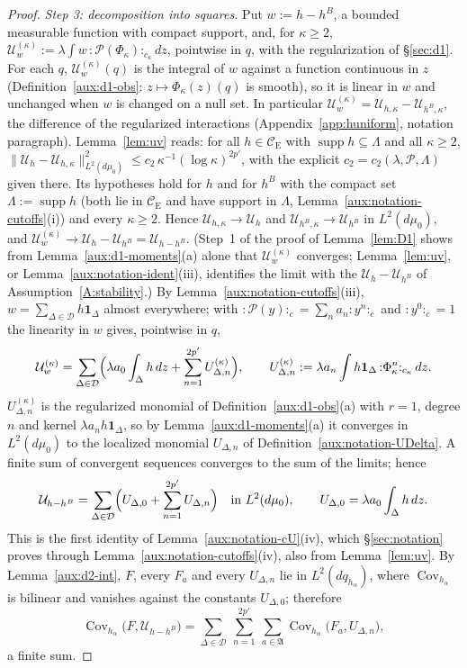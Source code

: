 \documentclass[11pt,a4paper]{article}
\theoremstyle{plain}
\theoremstyle{definition}
\theoremstyle{plain}
\theoremstyle{definition}
\newcommand{\CE}{\mathcal{C}_{\mathrm E}}
\DeclareMathOperator{\supp}{supp}
\DeclareMathOperator{\Cov}{Cov}
\newcommand{\Uc}{\mathcal U}
\newcommand{\dmu}{d\mu_0}
\begin{document}
\begin{proof}
\emph{Step 3: decomposition into squares.}  Put $w:=h-h^B$, a bounded measurable function with
compact support, and, for $\kappa\ge2$, $\Uc^{(\kappa)}_w:=\lambda\int w\,{:}\mathscr
P(\Phi_\kappa){:}_{c_\kappa}dz$, pointwise in $q$, with the regularization of
\S\ref{sec:d1}.  For each $q$, $\Uc^{(\kappa)}_w(q)$ is the integral of $w$ against a function
continuous in $z$ (Definition~\ref{aux:d1-obs}: $z\mapsto\Phi_\kappa(z)(q)$ is smooth), so it is
linear in $w$ and unchanged when $w$ is changed on a null set.  In particular
$\Uc^{(\kappa)}_w=\Uc_{h,\kappa}-\Uc_{h^B,\kappa}$, the difference of the regularized
interactions (Appendix~\ref{app:huniform}, notation paragraph).  Lemma~\ref{lem:uv} reads:
for all $h\in\CE$ with $\supp h\subseteq\Lambda$ and all $\kappa\ge2$,
$\|\mathcal U_h-\mathcal U_{h,\kappa}\|_{L^2(d\mu_0)}^2\le c_2\,\kappa^{-1}(\log\kappa)^{2p'}$,
with the explicit $c_2=c_2(\lambda,\mathscr P,\Lambda)$ given there.
Its hypotheses hold for $h$ and for $h^B$ with the compact set $\Lambda:=\supp h$ (both lie in
$\CE$ and have support in $\Lambda$, Lemma~\ref{aux:notation-cutoffs}(i)) and every $\kappa\ge2$.
Hence $\Uc_{h,\kappa}\to\Uc_h$ and $\Uc_{h^B,\kappa}\to\Uc_{h^B}$ in $L^2(\dmu)$, and
$\Uc^{(\kappa)}_w\to\Uc_h-\Uc_{h^B}=\Uc_{h-h^B}$.  (Step~1 of the proof of Lemma~\ref{lem:D1}
shows from Lemma~\ref{aux:d1-moments}(a) alone that $\Uc^{(\kappa)}_w$ converges;
Lemma~\ref{lem:uv}, or Lemma~\ref{aux:notation-ident}(iii), identifies the limit with the
$\Uc_h-\Uc_{h^B}$ of Assumption~\ref{A:stability}.)  By Lemma~\ref{aux:notation-cutoffs}(iii),
$w=\sum_{\Delta\in\mathcal D}h\mathbf 1_\Delta$ almost everywhere; with
${:}\mathscr P(y){:}_c=\sum_na_n{:}y^n{:}_c$ and ${:}y^0{:}_c=1$ the linearity in $w$ gives,
pointwise in $q$,
\[
 \Uc^{(\kappa)}_w=\sum_{\Delta\in\mathcal D}\Bigl(\lambda a_0\int_\Delta h\,dz
 +\sum_{n=1}^{2p'}U^{(\kappa)}_{\Delta,n}\Bigr),\qquad
 U^{(\kappa)}_{\Delta,n}:=\lambda a_n\int h\mathbf 1_\Delta\,{:}\Phi_\kappa^n{:}_{c_\kappa}\,dz .
\]
$U^{(\kappa)}_{\Delta,n}$ is the regularized monomial of Definition~\ref{aux:d1-obs}(a) with $r=1$,
degree $n$ and kernel $\lambda a_nh\mathbf 1_\Delta$, so by Lemma~\ref{aux:d1-moments}(a) it
converges in $L^2(\dmu)$ to the localized monomial $U_{\Delta,n}$ of
Definition~\ref{aux:notation-UDelta}.  A finite sum of convergent sequences converges to the sum
of the limits; hence
\[
 \Uc_{h-h^B}=\sum_{\Delta\in\mathcal D}\Bigl(U_{\Delta,0}+\sum_{n=1}^{2p'}U_{\Delta,n}\Bigr)
 \quad\text{in }L^2(\dmu),\qquad U_{\Delta,0}=\lambda a_0\int_\Delta h\,dz .
\]
This is the first identity of Lemma~\ref{aux:notation-cU}(iv), which \S\ref{sec:notation} proves
through Lemma~\ref{aux:notation-cutoffs}(iv), also from Lemma~\ref{lem:uv}.  By
Lemma~\ref{aux:d2-int}, $F$, every
$F_a$ and every $U_{\Delta,n}$ lie in $L^2(dq_{h_\alpha})$, where $\Cov_{h_\alpha}$ is bilinear
and vanishes against the constants $U_{\Delta,0}$; therefore
\[
 \Cov_{h_\alpha}\bigl(F,\Uc_{h-h^B}\bigr)
 =\sum_{\Delta\in\mathcal D}\ \sum_{n=1}^{2p'}\ \sum_{a\in\mathfrak A}
  \Cov_{h_\alpha}\bigl(F_a,U_{\Delta,n}\bigr),
\]
a finite sum.


\end{proof}
\end{document}
